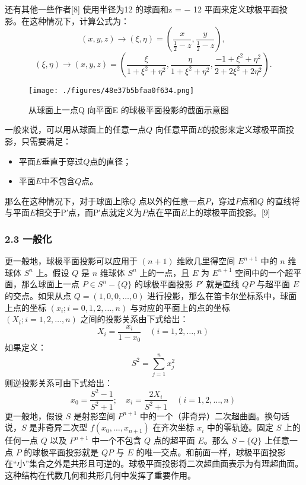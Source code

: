 还有其他一些作者[8] 使用半径为12 的球面和z = − 12 平面来定义球极平面投影。在这种情况下，计算公式为：
$$(x, y, z) \rightarrow (\xi, \eta) = \left( \frac{x}{\frac{1}{2} - z}, \frac{y}{\frac{1}{2} - z} \right),~$$
$$(\xi, \eta) \rightarrow (x, y, z) = \left( \frac{\xi}{1 + \xi^2 + \eta^2}, \frac{\eta}{1 + \xi^2 + \eta^2}, \frac{-1 + \xi^2 + \eta^2}{2 + 2\xi^2 + 2\eta^2} \right).~$$
\begin{figure}[ht]
\centering
\texttt{[image: ./figures/48e37b5bfaa0f634.png]}
\caption{从球面上一点Q 向平面E 的球极平面投影的截面示意图} \label{fig_QJPMTY_4}
\end{figure}
一般来说，可以用从球面上的任意一点$Q$ 向任意平面$E$的投影来定义球极平面投影，只需要满足：
\begin{itemize}
\item 平面$E$垂直于穿过$Q$点的直径；
\item 平面$E$中不包含$Q$点。
\end{itemize}
那么在这种情况下，对于球面上除$Q$ 点以外的任意一点$P$，穿过$P$点和$Q$ 的直线将与平面$E$相交于P′点，而P′点就定义为$P$点在平面$E$上的球极平面投影。[9]
\subsubsection{2.3 一般化}
更一般地，球极平面投影可以应用于 $(n + 1)$ 维欧几里得空间 \(E^{n+1}\) 中的 \(n\) 维球体 \(S^n\) 上。假设 \(Q\) 是 \(n\) 维球体 \(S^n\) 上的一点，且 \(E\) 为 \(E^{n+1}\) 空间中的一个超平面，那么球面上一点 \(P \in S^n - \{Q\}\) 的球极平面投影 \(P'\) 就是直线 \(QP\) 与超平面 \(E\) 的交点。如果从点 \(Q = (1, 0, 0, \ldots, 0)\) 进行投影，那么在笛卡尔坐标系中，球面上点的坐标 \((x_i; i = 0, 1, 2, \ldots, n)\) 与对应的平面上的点的坐标 \((X_i; i = 1, 2, \ldots, n)\) 之间的投影关系由下式给出：
$$X_i = \frac{x_i}{1 - x_0} \quad (i = 1, 2, \ldots, n)~$$
如果定义：
$$S^2 = \sum_{j=1}^n x_j^2~$$
则逆投影关系可由下式给出：
$$x_0 = \frac{S^2 - 1}{S^2 + 1}; \quad x_i = \frac{2X_i}{S^2 + 1} \quad (i = 1, 2, \ldots, n)~$$
更一般地，假设 \(S\) 是射影空间 \(P^{n+1}\) 中的一个（非奇异）二次超曲面。换句话说，\(S\) 是非奇异二次型 \(f(x_0,  \ldots, x_{n+1})\) 在齐次坐标 \(x_i\) 中的零轨迹。固定 \(S\) 上的任何一点 \(Q\) 以及 \(P^{n+1}\) 中一个不包含 \(Q\) 点的超平面 \(E\)。那么 \(S - \{Q\}\) 上任意一点 \(P\) 的球极平面投影就是 \(QP\) 与 \(E\) 的唯一交点。和前面一样，球极平面投影在“小”集合之外是共形且可逆的。球极平面投影将二次超曲面表示为有理超曲面。这种结构在代数几何和共形几何中发挥了重要作用。